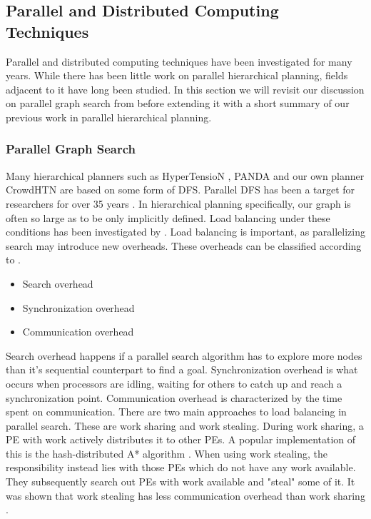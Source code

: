 \subsection{Parallel and Distributed Computing Techniques}
\label{prelim: parallel distributed}
Parallel and distributed computing techniques have been investigated for many years. While there has been little work on parallel hierarchical planning, fields adjacent to it have long been studied. In this section we will revisit our discussion on parallel graph search from \cite{bretl2021parallel} before extending it with a short summary of our previous work in parallel hierarchical planning.

\subsubsection{Parallel Graph Search}
Many hierarchical planners such as HyperTensioN \cite{magnaguagno2020hypertension}, PANDA \cite{holler2020htn} and our own planner CrowdHTN \cite{bretl2021parallel} are based on some form of DFS. Parallel DFS has been a target for researchers for over 35 years \cite{rao1987parallel, kumar1987parallel}. In hierarchical planning specifically, our graph is often so large as to be only implicitly defined. Load balancing under these conditions has been investigated by \cite{sanders1997lastverteilungsalgorithmen}. Load balancing is important, as parallelizing search may introduce new overheads. These overheads can be classified according to \cite{fukunaga2018parallel}.
\begin{itemize}
	\item Search overhead
	\item Synchronization overhead
	\item Communication overhead
\end{itemize}
Search overhead happens if a parallel search algorithm has to explore more nodes than it's sequential counterpart to find a goal. Synchronization overhead is what occurs when processors are idling, waiting for others to catch up and reach a synchronization point. Communication overhead is characterized by the time spent on communication. There are two main approaches to load balancing in parallel search. These are work sharing and work stealing. During work sharing, a PE with work actively distributes it to other PEs. A popular implementation of this is the hash-distributed A* algorithm \cite{kishimoto2009scalable}. When using work stealing, the responsibility instead lies with those PEs which do not have any work available. They subsequently search out PEs with work available and "steal" some of it. It was shown that work stealing has less communication overhead than work sharing \cite{blumofe1999scheduling}. \\
